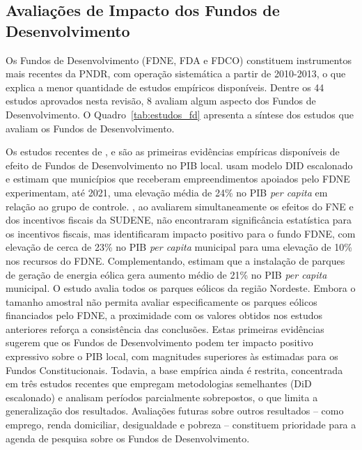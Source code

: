 \subsection{Avaliações de Impacto dos Fundos de Desenvolvimento}

Os Fundos de Desenvolvimento (FDNE, FDA e FDCO) constituem instrumentos mais recentes da PNDR, com operação sistemática a partir de 2010-2013, o que explica a menor quantidade de estudos empíricos disponíveis. Dentre os 44 estudos aprovados nesta revisão, 8 avaliam algum aspecto dos Fundos de Desenvolvimento. O Quadro~\ref{tab:estudos_fd} apresenta a síntese dos estudos que avaliam os Fundos de Desenvolvimento.



Os estudos recentes de ,  e  são as primeiras evidências empíricas disponíveis de efeito de Fundos de Desenvolvimento no PIB local.  usam modelo DID escalonado e estimam que municípios que receberam empreendimentos apoiados pelo FDNE experimentam, até 2021, uma elevação média de 24\% no PIB \textit{per capita} em relação ao grupo de controle. , ao avaliarem simultaneamente os efeitos do FNE e dos incentivos fiscais da SUDENE, não encontraram significância estatística para os incentivos fiscais, mas identificaram impacto positivo para o fundo FDNE, com elevação de cerca de 23\% no PIB \textit{per capita} municipal para uma elevação de 10\% nos recursos do FDNE. Complementando,  estimam que a instalação de parques de geração de energia eólica gera aumento médio de 21\% no PIB \textit{per capita} municipal. O estudo avalia todos os parques eólicos da região Nordeste. Embora o tamanho amostral não permita avaliar especificamente os parques eólicos financiados pelo FDNE, a proximidade com os valores obtidos nos estudos anteriores reforça a consistência das conclusões. Estas primeiras evidências sugerem que os Fundos de Desenvolvimento podem ter impacto positivo expressivo sobre o PIB local, com magnitudes superiores às estimadas para os Fundos Constitucionais. Todavia, a base empírica ainda é restrita, concentrada em três estudos recentes que empregam metodologias semelhantes (DiD escalonado) e analisam períodos parcialmente sobrepostos, o que limita a generalização dos resultados. Avaliações futuras sobre outros resultados -- como emprego, renda domiciliar, desigualdade e pobreza -- constituem prioridade para a agenda de pesquisa sobre os Fundos de Desenvolvimento.

